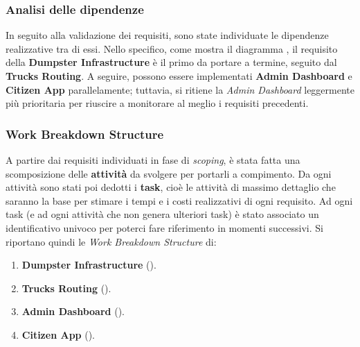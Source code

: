 \subsubsection{Analisi delle dipendenze}
In seguito alla validazione dei requisiti, sono state individuate le dipendenze realizzative tra di essi. Nello specifico, come mostra il diagramma , il requisito della \textbf{Dumpster Infrastructure} è il primo da portare a termine, seguito dal \textbf{Trucks Routing}. A seguire, possono essere implementati \textbf{Admin Dashboard} e \textbf{Citizen App} parallelamente; tuttavia, si ritiene la \textit{Admin Dashboard} leggermente più prioritaria per riuscire a monitorare al meglio i requisiti precedenti.

\subsubsection{Work Breakdown Structure}
A partire dai requisiti individuati in fase di \textit{scoping}, è stata fatta una scomposizione delle \textbf{attività} da svolgere per portarli a compimento. Da ogni attività sono stati poi dedotti i \textbf{task}, cioè le attività di massimo dettaglio che saranno la base per stimare i tempi e i costi realizzativi di ogni requisito. Ad ogni task (e ad ogni attività che non genera ulteriori task) è stato associato un identificativo univoco per poterci fare riferimento in momenti successivi.
Si riportano quindi le \textit{Work Breakdown Structure} di:
\begin{enumerate}
    \item \textbf{Dumpster Infrastructure} ().
    \item \textbf{Trucks Routing} ().
    \item \textbf{Admin Dashboard} ().
    \item \textbf{Citizen App} ().
\end{enumerate}

